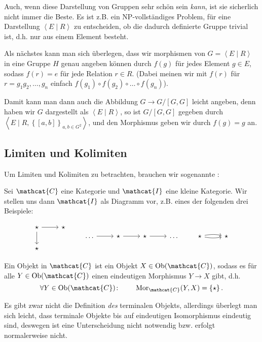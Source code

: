 \begin{remark*}
\Warning    Auch, wenn diese Darstellung von Gruppen sehr schön sein \textit{kann}, ist sie sicherlich nicht immer die Beste. Es ist z.B. ein NP-vollständiges Problem, für eine Darstellung $\left< E \mid  R \right> $ zu entscheiden, ob die dadurch definierte Gruppe trivial ist, d.h. nur aus einem Element besteht.
\end{remark*}
\begin{recap}
    Als nächstes kann man sich überlegen, dass wir morphismen von $G = \left< E \mid  R \right> $ in eine Gruppe $H$ genau angeben können durch  $f(g)$ für jedes Element  $g\in E$, sodass $f(r) = e$ für jede Relation  $r\in R$. (Dabei meinen wir mit $f(r)$ für  $r = g_1g_2,\ldots,g_n$ einfach $f(g_1)\circ f(g_2)\circ \ldots\circ f(g_n)$). 

    Damit kann man dann auch die Abbildung $G \to  G / [G,G]$ leicht angeben, denn haben wir $G$ dargestellt als  $\left< E \mid  R \right> $, so ist $G / [G,G]$ gegeben durch  $\left< E \mid R, \left \{[a,b]\right\} _{a,b\in G^2} \right> $, und den Morphismus geben wir durch $f(g) = g$ an.
\end{recap}

\subsection{Limiten und Kolimiten}
Um Limiten und Kolimiten zu betrachten, brauchen wir sogenannte :

Sei $\mathcat{C}$ eine Kategorie und $\mathcat{I}$ eine kleine Kategorie. Wir stellen uns dann $\mathcat{I}$ als Diagramm vor, z.B. eines der folgenden drei Beispiele:

\begin{equation}
\begin{tikzcd}
    \star \ar{r} \ar{d} & \star \\
    \star
\end{tikzcd} 
\qquad
\begin{tikzcd}
    \ldots \ar{r} & \star \ar{r} & \star \ar{r} &\ldots
\end{tikzcd}
\qquad
\begin{tikzcd}
    \star \ar[bend left = 10]{r} \ar[bend right = 10]{r} & \star
\end{tikzcd}
\label{eq:diagramme}
\end{equation}

\begin{definition}
    Ein  Objekt in $\mathcat{C}$ ist ein Objekt $X\in \Ob(\mathcat{C})$, sodass es für alle $Y\in \Ob(\mathcat{C})$ einen eindeutigen Morphismus $Y \to  X$ gibt, d.h.
     \[
         \forall Y\in \Ob(\mathcat{C})\colon  \qquad \Mor_{\mathcat{C}}(Y,X) = \left \{\star\right\} 
    .\] 
\end{definition}
\begin{oral}
    Es gibt zwar nicht die Definition \textit{des} terminalen Objekts, allerdings überlegt man sich leicht, dass terminale Objekte bis auf eindeutigen Isomorphismus eindeutig sind, deswegen ist eine Unterscheidung nicht notwendig bzw. erfolgt normalerweise nicht.
\end{oral}

